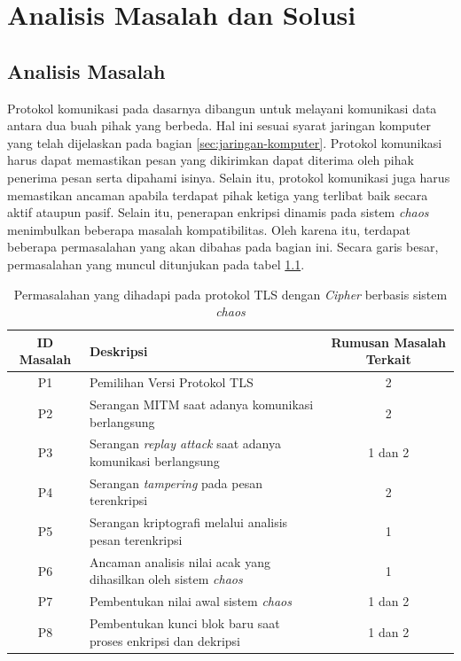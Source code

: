 

\chapter{Analisis Masalah dan Solusi}

\section{Analisis Masalah}
\label{sec:analisis-masalah}

Protokol komunikasi pada dasarnya dibangun untuk melayani komunikasi data antara dua buah pihak yang berbeda. Hal ini sesuai syarat jaringan komputer yang telah dijelaskan pada bagian \ref{sec:jaringan-komputer}. Protokol komunikasi harus dapat memastikan pesan yang dikirimkan dapat diterima oleh pihak penerima pesan serta dipahami isinya. Selain itu, protokol komunikasi juga harus memastikan ancaman apabila terdapat pihak ketiga yang terlibat baik secara aktif ataupun pasif. Selain itu, penerapan enkripsi dinamis pada sistem \emph{chaos} menimbulkan beberapa masalah kompatibilitas. Oleh karena itu, terdapat beberapa permasalahan yang akan dibahas pada bagian ini. Secara garis besar, permasalahan yang muncul ditunjukan pada tabel \ref{tab:permasalahan}.

\begin{table}[!h]
  \centering
  \caption{Permasalahan yang dihadapi pada protokol TLS dengan \emph{Cipher} berbasis sistem \emph{chaos}} \label{tab:permasalahan}
  \begin{tabular}{|c|p{6cm}|c|}
    \hline
    \textbf{ID Masalah} & \textbf{Deskripsi} & \textbf{Rumusan Masalah Terkait} \\
    \hline
    P1 & Pemilihan Versi Protokol TLS & 2 \\ \hline
    P2 & Serangan MITM saat adanya komunikasi berlangsung & 2 \\ \hline
    P3 & Serangan \emph{replay attack} saat adanya komunikasi berlangsung & 1 dan 2 \\ \hline
    P4 & Serangan \emph{tampering} pada pesan terenkripsi & 2 \\ \hline
    P5 & Serangan kriptografi melalui analisis pesan terenkripsi & 1 \\ \hline
    P6 & Ancaman analisis nilai acak yang dihasilkan oleh sistem \emph{chaos} & 1 \\ \hline
    P7 & Pembentukan nilai awal sistem \emph{chaos} & 1 dan 2 \\ \hline
    P8 & Pembentukan kunci blok baru saat proses enkripsi dan dekripsi & 1 dan 2 \\ \hline
  \end{tabular}
\end{table}

